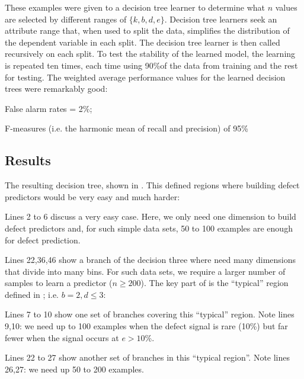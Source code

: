     These examples were given to a decision tree learner to determine what $n$ values are selected by different
    ranges of $\{k,b,d,e\}$. Decision tree learners seek an attribute range that, when used to split the data,
      simplifies the distribution of the dependent variable in each split.
      The decision tree learner is then called recursively on each split.
      To test the stability of the learned model, the learning is repeated ten times, each time using 90\%of the data from training and the rest
      for testing. The weighted average performance values for the learned decision trees were remarkably good:
      \bi
    \item False alarm rates = 2\%;
    \item F-measures (i.e. the harmonic mean of recall and precision) of 95\%
      \ei
\subsection{Results}

The resulting decision tree, shown in . This defined regions where
building defect predictors would be very easy and much harder:
\bi
\item
Lines 2 to 6 discuss a very easy case. Here, we only need
one dimension to build defect predictors and,
for such simple data sets, 50 to 100 examples are enough for defect prediction.
\item
Lines 22,36,46 show a branch of the decision three
where  need many dimensions that divide into many bins.
For such data sets, we require a larger number of samples to learn a predictor ($n \ge 200$).
\ei
The key part of  is the ``typical'' region defined in ;
i.e.    $b=2, d \le 3$:
\bi
\item Lines 7 to 10 show one set of branches covering this ``typical'' region. Note
lines 9,10:  we need up to 100 examples when the defect signal is rare (10\%) but
far fewer when the signal occurs at $e>10$\%.
\item
Lines 22 to 27 show another set of branches in this ``typical region''. Note lines 26,27:
we need up 50 to 200 examples.
\ei
